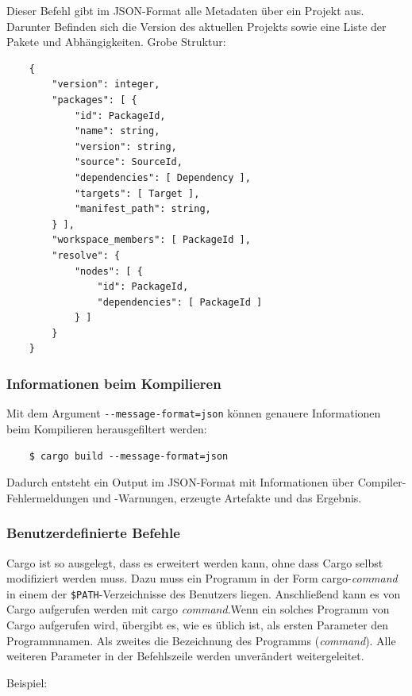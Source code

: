Dieser Befehl gibt im JSON-Format alle Metadaten über ein Projekt aus. Darunter Befinden sich die Version des aktuellen Projekts sowie eine Liste der Pakete und Abhängigkeiten. Grobe Struktur:

\begin{lstlisting}
    {
        "version": integer,
        "packages": [ {
            "id": PackageId,
            "name": string,
            "version": string,
            "source": SourceId,
            "dependencies": [ Dependency ],
            "targets": [ Target ],
            "manifest_path": string,
        } ],
        "workspace_members": [ PackageId ],
        "resolve": {
            "nodes": [ {
                "id": PackageId,
                "dependencies": [ PackageId ]
            } ]
        }
    }
\end{lstlisting}

\subsubsection{Informationen beim Kompilieren}

Mit dem Argument \verb"--message-format=json" können genauere Informationen beim Kompilieren herausgefiltert werden:

\begin{lstlisting}
    $ cargo build --message-format=json
\end{lstlisting}

Dadurch entsteht ein Output im JSON-Format mit Informationen über Compiler-Fehlermeldungen und -Warnungen, erzeugte Artefakte und das Ergebnis.

\subsubsection{Benutzerdefinierte Befehle}

Cargo ist so ausgelegt, dass es erweitert werden kann, ohne dass Cargo selbst modifiziert werden muss. Dazu muss ein Programm in der Form cargo-\textit{command} in einem der \verb"$PATH"-Verzeichnisse des Benutzers liegen. Anschließend kann es von Cargo aufgerufen werden mit \glqq cargo \textit{command}\grqq{}.Wenn ein solches Programm von Cargo aufgerufen wird, übergibt es, wie es üblich ist, als ersten Parameter den Programmnamen. Als zweites die Bezeichnung des Programms (\textit{command}). Alle weiteren Parameter in der Befehlszeile werden unverändert weitergeleitet.

Beispiel:

